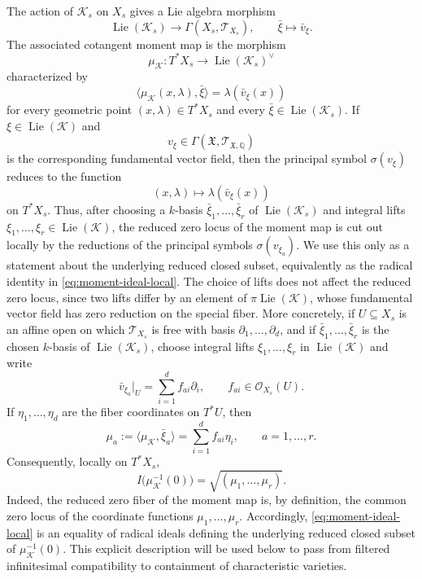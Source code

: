 \documentclass[11pt]{amsart}
\theoremstyle{plain}
\theoremstyle{definition}
\theoremstyle{remark}
\newcommand{\Lie}{\operatorname{Lie}}
\begin{document}
The action of \(\mathcal K_s\) on \(X_s\) gives a Lie algebra morphism
\[
  \Lie(\mathcal K_s)
  \longrightarrow
  \Gamma(X_s,\mathscr T_{X_s}),
  \qquad
  \bar\xi\longmapsto \bar v_\xi.
\]
The associated cotangent moment map is the morphism
\[
  \mu_{\mathcal K}:T^*X_s\longrightarrow \Lie(\mathcal K_s)^\vee
\]
characterized by
\[
  \langle \mu_{\mathcal K}(x,\lambda),\bar\xi\rangle
  =
  \lambda(\bar v_\xi(x))
\]
for every geometric point \((x,\lambda)\in T^*X_s\) and every
\(\bar\xi\in\Lie(\mathcal K_s)\).  If
\(\xi\in\Lie(\mathcal K)\) and
\[
  v_\xi\in \Gamma(\mathfrak X,\mathscr T_{\mathfrak X,\mathbb Q})
\]
is the corresponding fundamental vector field, then the principal symbol
\(\sigma(v_\xi)\) reduces to the function
\[
  (x,\lambda)\longmapsto \lambda(\bar v_\xi(x))
\]
on \(T^*X_s\).  Thus, after choosing a \(k\)-basis
\(\bar\xi_1,\ldots,\bar\xi_r\) of \(\Lie(\mathcal K_s)\) and
integral lifts \(\xi_1,\ldots,\xi_r\in\Lie(\mathcal K)\), the reduced
zero locus of the moment map is cut out locally by the reductions of the
principal symbols \(\sigma(v_{\xi_a})\).  We use this only as a statement
about the underlying reduced closed subset, equivalently as the radical
identity in \eqref{eq:moment-ideal-local}.  The choice of lifts does not affect
the reduced zero locus, since two lifts differ by an element of
\(\pi\Lie(\mathcal K)\), whose fundamental vector field has zero reduction on
the special fiber.
More concretely, if \(U\subseteq X_s\) is an affine open on which
\(\mathscr T_{X_s}\) is free with basis
\(\partial_1,\ldots,\partial_d\), and if
\(\bar\xi_1,\ldots,\bar\xi_r\) is the chosen \(k\)-basis of
\(\Lie(\mathcal K_s)\), choose integral lifts
\(\xi_1,\ldots,\xi_r\) in \(\Lie(\mathcal K)\) and write
\[
  \bar v_{\xi_a}|_U=\sum_{i=1}^d f_{ai}\partial_i,
  \qquad f_{ai}\in\mathcal O_{X_s}(U).
\]
If \(\eta_1,\ldots,\eta_d\) are the fiber coordinates on
\(T^*U\), then
\begin{equation}
\label{eq:local-moment-equations}
  \mu_a:=\langle\mu_{\mathcal K},\bar\xi_a\rangle
  =\sum_{i=1}^d f_{ai}\eta_i,
  \qquad a=1,\ldots,r.
\end{equation}
Consequently, locally on \(T^*X_s\),
\begin{equation}
\label{eq:moment-ideal-local}
  I\bigl(\mu_{\mathcal K}^{-1}(0)\bigr)
  =\sqrt{(\mu_1,\ldots,\mu_r)}.
\end{equation}
Indeed, the reduced zero fiber of the moment map is, by definition, the
common zero locus of the coordinate functions \(\mu_1,\ldots,\mu_r\). Accordingly, \eqref{eq:moment-ideal-local} is an equality of radical ideals defining the
underlying reduced closed subset of \(\mu_{\mathcal K}^{-1}(0)\). This explicit
description will be used below to pass from filtered infinitesimal
compatibility to containment of characteristic varieties.
\end{document}
